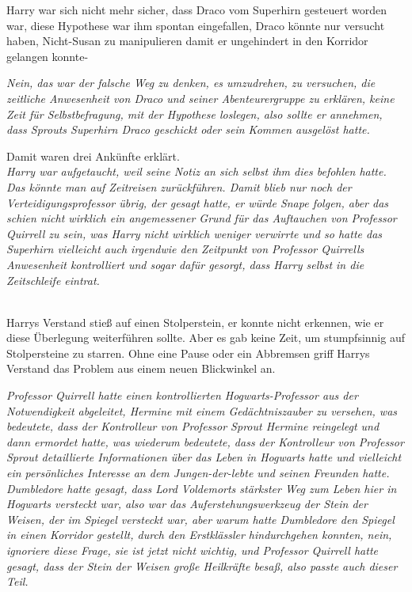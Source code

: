 {Harry war sich nicht mehr sicher, dass Draco vom Superhirn gesteuert worden war, diese Hypothese war ihm spontan eingefallen, Draco könnte nur versucht haben, Nicht-Susan zu manipulieren damit er ungehindert in den Korridor gelangen konnte-

\emph{Nein, das war der falsche Weg zu denken, es umzudrehen, zu versuchen, die zeitliche Anwesenheit von Draco und seiner Abenteurergruppe zu erklären, keine Zeit für Selbstbefragung, mit der Hypothese loslegen, also sollte er annehmen, dass Sprouts Superhirn Draco geschickt oder sein Kommen ausgelöst hatte.}

Damit waren drei Ankünfte erklärt.\\ \emph{\hfill\break Harry war aufgetaucht, weil seine Notiz an sich selbst ihm dies befohlen hatte.\\ Das könnte man auf Zeitreisen zurückführen. Damit blieb nur noch der Verteidigungsprofessor übrig, der gesagt hatte, er würde Snape folgen, aber das schien nicht wirklich ein angemessener Grund für das Auftauchen von Professor Quirrell zu sein, was Harry nicht wirklich weniger verwirrte und so hatte das Superhirn vielleicht auch irgendwie den Zeitpunkt von Professor Quirrells Anwesenheit kontrolliert und sogar dafür gesorgt, dass Harry selbst in die} \emph{Zeitschleife eintrat.\\ }\strut \\ Harrys Verstand stieß auf einen Stolperstein, er konnte nicht erkennen, wie er diese Überlegung weiterführen sollte. Aber es gab keine Zeit, um stumpfsinnig auf Stolpersteine zu starren. Ohne eine Pause oder ein Abbremsen griff Harrys Verstand das Problem aus einem neuen Blickwinkel an.

\emph{Professor Quirrell hatte einen kontrollierten Hogwarts-Professor aus der Notwendigkeit abgeleitet, Hermine mit einem Gedächtniszauber zu versehen, was bedeutete, dass der Kontrolleur von Professor Sprout Hermine reingelegt und dann ermordet hatte, was wiederum bedeutete, dass der Kontrolleur von Professor Sprout detaillierte Informationen über das Leben in Hogwarts hatte und vielleicht ein persönliches Interesse an dem Jungen-der-lebte und seinen Freunden hatte.\\ Dumbledore hatte gesagt, dass Lord Voldemorts stärkster Weg zum Leben hier in Hogwarts versteckt war, also war das Auferstehungswerkzeug der Stein der Weisen, der im Spiegel versteckt war, aber warum hatte Dumbledore den Spiegel in einen Korridor gestellt, durch den Erstklässler hindurchgehen konnten, nein, ignoriere diese Frage, sie ist jetzt nicht wichtig, und Professor Quirrell hatte gesagt, dass der Stein der Weisen große Heilkräfte besaß, also passte auch dieser Teil.}

}
